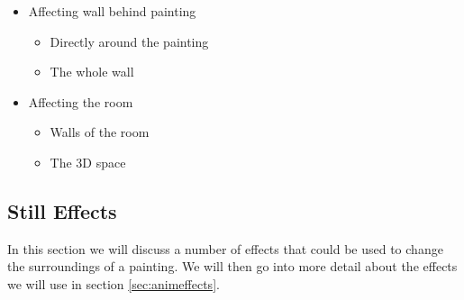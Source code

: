\documentclass[a4paper]{article}
\begin{document}
\begin{itemize}
\item Affecting wall behind painting
\begin{itemize}
\item Directly around the painting
\item The whole wall
\end{itemize}
\item Affecting the room
\begin{itemize}
\item Walls of the room
\item The 3D space
\end{itemize}
\end{itemize}

\subsection{Still Effects}

In this section we will discuss a number of effects that could be used to change the surroundings of a painting. We will then go into more detail about the effects we will use in section \ref{sec:animeffects}.
\end{document}
